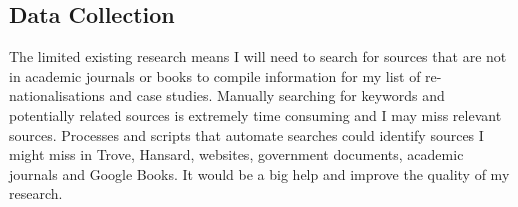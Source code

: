 \documentclass[a4paper]{article}
\begin{document}
\par
\subsection*{Data Collection}

The limited existing research means I will need to search for sources that are not in academic journals or books to compile information for my list of re-nationalisations and case studies. Manually searching for keywords and potentially related sources is extremely time consuming and I may miss relevant sources.  Processes and scripts that automate searches could identify sources I might miss in Trove, Hansard, websites, government documents, academic journals and Google Books. It would be a big help and improve the quality of my research.
\end{document}
